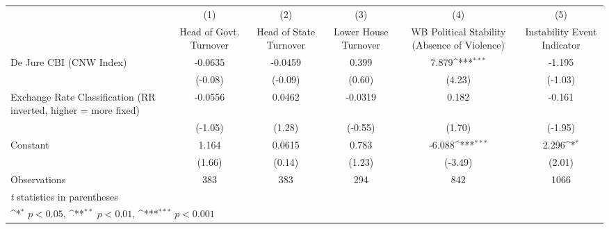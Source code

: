 {
\def\sym#1{\ifmmode^{#1}\else\(^{#1}\)\fi}
\begin{tabular}{l*{5}{c}}
\hline\hline
                &\multicolumn{1}{c}{(1)}&\multicolumn{1}{c}{(2)}&\multicolumn{1}{c}{(3)}&\multicolumn{1}{c}{(4)}&\multicolumn{1}{c}{(5)}\\
                &\multicolumn{1}{c}{Head of Govt. Turnover}&\multicolumn{1}{c}{Head of State Turnover}&\multicolumn{1}{c}{Lower House Turnover}&\multicolumn{1}{c}{WB Political Stability (Absence of Violence)}&\multicolumn{1}{c}{Instability Event Indicator}\\
\hline
De Jure CBI (CNW Index)&  -0.0635         &  -0.0459         &    0.399         &    7.879\sym{***}&   -1.195         \\
                &  (-0.08)         &  (-0.09)         &   (0.60)         &   (4.23)         &  (-1.03)         \\
[1em]
Exchange Rate Classification (RR inverted, higher = more fixed)&  -0.0556         &   0.0462         &  -0.0319         &    0.182         &   -0.161         \\
                &  (-1.05)         &   (1.28)         &  (-0.55)         &   (1.70)         &  (-1.95)         \\
[1em]
Constant        &    1.164         &   0.0615         &    0.783         &   -6.088\sym{***}&    2.296\sym{*}  \\
                &   (1.66)         &   (0.14)         &   (1.23)         &  (-3.49)         &   (2.01)         \\
\hline
Observations    &      383         &      383         &      294         &      842         &     1066         \\
\hline\hline
\multicolumn{6}{l}{\footnotesize \textit{t} statistics in parentheses}\\
\multicolumn{6}{l}{\footnotesize \sym{*} \(p<0.05\), \sym{**} \(p<0.01\), \sym{***} \(p<0.001\)}\\
\end{tabular}
}
